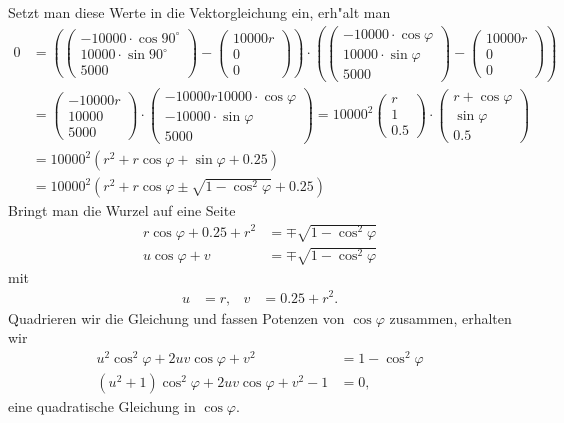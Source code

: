\begin{loesung}
\begin{teilaufgaben}
Setzt man diese Werte in die Vektorgleichung ein, erh"alt man
\begin{align*}
0
&=
\left(
\begin{pmatrix}
-10000\cdot\cos 90^\circ\\
 10000\cdot\sin 90^\circ\\
5000
\end{pmatrix}
-\begin{pmatrix}10000r\\0\\0\end{pmatrix}
\right)
\cdot
\left(
\begin{pmatrix}
-10000\cdot\cos\varphi\\
 10000\cdot\sin\varphi\\
5000
\end{pmatrix}
-\begin{pmatrix}10000r\\0\\0\end{pmatrix}
\right)
\\
&=
\begin{pmatrix}
-10000r\\
 10000\\
 5000
\end{pmatrix}
\cdot
\begin{pmatrix}
-10000r
 10000\cdot\cos\varphi\\
-10000\cdot\sin\varphi\\
  5000
\end{pmatrix}
=
10000^2
\begin{pmatrix}
r\\
1\\
0.5
\end{pmatrix}
\cdot
\begin{pmatrix}
r
+
\cos\varphi\\
\sin\varphi\\
0.5
\end{pmatrix}
\\
&=
10000^2 ( r^2 + r\cos\varphi+\sin\varphi +0.25)
\\
&=
10000^2 ( r^2 + r\cos\varphi\pm\sqrt{1-\cos^2\varphi}+0.25)
\end{align*}
Bringt man die Wurzel auf eine Seite
\begin{align*}
r\cos\varphi + 0.25+r^2&=\mp\sqrt{1-\cos^2\varphi}\\
u\cos\varphi + v&=\mp\sqrt{1-\cos^2\varphi}
\end{align*}
mit
\[
\begin{aligned}
u&=r,&
v&=0.25 + r^2.
\end{aligned}
\]
Quadrieren wir die Gleichung und fassen Potenzen von $\cos\varphi$
zusammen, erhalten wir
\begin{align*}
u^2\cos^2\varphi + 2uv\cos\varphi+v^2&=1-\cos^2\varphi
\\
(u^2+1)\cos^2\varphi +2uv\cos\varphi+v^2-1&=0,
\end{align*}
eine quadratische Gleichung in $\cos\varphi$.


\end{teilaufgaben}
\end{loesung}
